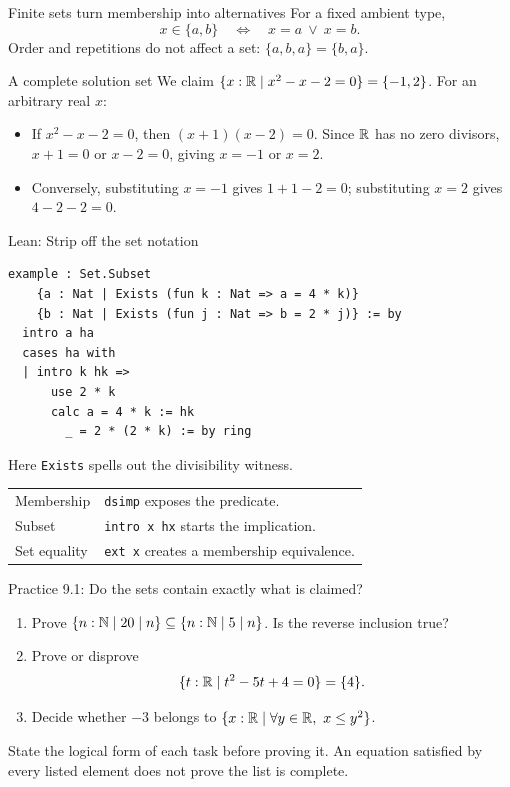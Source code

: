 \begin{frame}{Finite sets turn membership into alternatives}
For a fixed ambient type,
\[
 x\in\{a,b\}\quad\Longleftrightarrow\quad x=a\ \lor\ x=b.
\]
Order and repetitions do not affect a set: $\{a,b,a\}=\{b,a\}$.
\begin{exampleblock}{A complete solution set}
We claim $\{x:\mathbb{R}\mid x^2-x-2=0\}=\{-1,2\}$.
For an arbitrary real $x$:
\begin{itemize}
\item If $x^2-x-2=0$, then $(x+1)(x-2)=0$.
Since $\mathbb{R}$ has no zero divisors, $x+1=0$ or $x-2=0$, giving $x=-1$ or $x=2$.
\item Conversely, substituting $x=-1$ gives $1+1-2=0$;
substituting $x=2$ gives $4-2-2=0$.
\end{itemize}
\end{exampleblock}
\end{frame}

\begin{frame}[fragile]{Lean: Strip off the set notation}
\begin{lstlisting}
example : Set.Subset
    {a : Nat | Exists (fun k : Nat => a = 4 * k)}
    {b : Nat | Exists (fun j : Nat => b = 2 * j)} := by
  intro a ha
  cases ha with
  | intro k hk =>
      use 2 * k
      calc a = 4 * k := hk
        _ = 2 * (2 * k) := by ring
\end{lstlisting}
Here \texttt{Exists} spells out the divisibility witness.
\begin{center}
\begin{tabular}{ll}
Membership & \texttt{dsimp} exposes the predicate.\\
Subset & \texttt{intro x hx} starts the implication.\\
Set equality & \texttt{ext x} creates a membership equivalence.
\end{tabular}
\end{center}
\end{frame}

\begin{frame}{Practice 9.1: Do the sets contain exactly what is claimed?}
\begin{enumerate}
\item Prove $\{n:\mathbb{N}\mid20\mid n\}\subseteq\{n:\mathbb{N}\mid5\mid n\}$.
Is the reverse inclusion true?
\item Prove or disprove
\[
 \{t:\mathbb{R}\mid t^2-5t+4=0\}=\{4\}.
\]
\item Decide whether $-3$ belongs to
$\{x:\mathbb{R}\mid\forall y\in\mathbb{R},\ x\le y^2\}$.
\end{enumerate}
State the logical form of each task before proving it.
An equation satisfied by every listed element does not prove the list is complete.
\end{frame}

